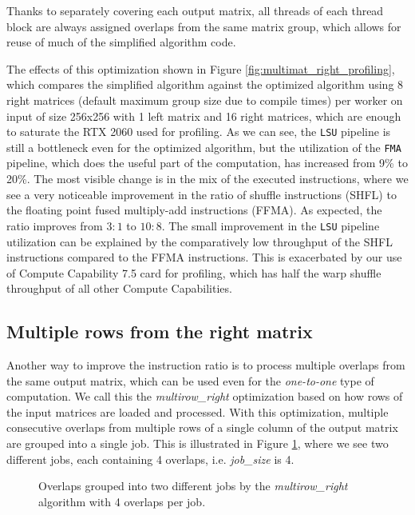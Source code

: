 Thanks to separately covering each output matrix, all threads of each thread block are always assigned overlaps from the same matrix group, which allows for reuse of much of the simplified algorithm code.

The effects of this optimization shown in Figure \ref{fig:multimat_right_profiling}, which compares the simplified algorithm against the optimized algorithm using 8 right matrices (default maximum group size due to compile times) per worker on input of size 256x256 with 1 left matrix and 16 right matrices, which are enough to saturate the RTX 2060 used for profiling. As we can see, the \texttt{LSU} pipeline is still a bottleneck even for the optimized algorithm, but the utilization of the \texttt{FMA} pipeline, which does the useful part of the computation, has increased from 9\% to 20\%. The most visible change is in the mix of the executed instructions, where we see a very noticeable improvement in the ratio of shuffle instructions (SHFL) to the floating point fused multiply-add instructions (FFMA). As expected, the ratio improves from $3 : 1$ to $10 : 8$. The small improvement in the \texttt{LSU} pipeline utilization can be explained by the comparatively low throughput of the SHFL instructions compared to the FFMA instructions. This is exacerbated by our use of Compute Capability 7.5 card for profiling, which has half the warp shuffle throughput of all other Compute Capabilities.


\subsection{Multiple rows from the right matrix}
\label{sec:multirow_right}

Another way to improve the instruction ratio is to process multiple overlaps from the same output matrix, which can be used even for the \textit{one-to-one} type of computation. We call this the \textit{multirow\_right} optimization based on how rows of the input matrices are loaded and processed. With this optimization, multiple consecutive overlaps from multiple rows of a single column of the output matrix are grouped into a single job. This is illustrated in Figure \ref{fig:multirow_shifts}, where we see two different jobs, each containing 4 overlaps, i.e. \textit{job\_size} is 4. 

\begin{figure}[ht]
	\centering
	\def\svgwidth{0.5\textwidth}
	\fontsize{6}{8}\selectfont
	
	\caption{Overlaps grouped into two different jobs by the \textit{multirow\_right} algorithm with 4 overlaps per job.}
	\label{fig:multirow_shifts}
\end{figure}

